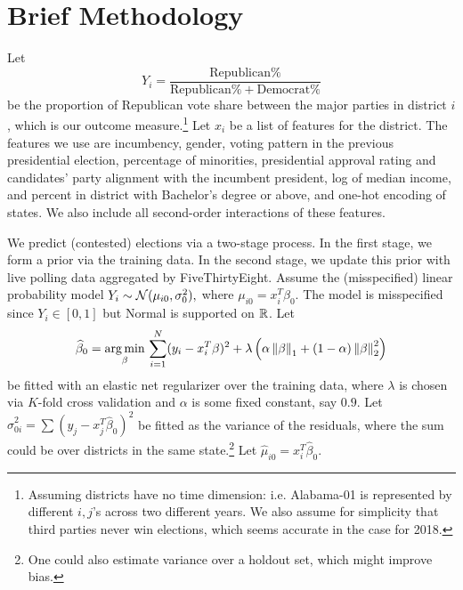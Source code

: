 \documentclass[12pt]{article}
\begin{document}
\section*{Brief Methodology}
Let \[Y_i = \frac{\text{Republican}\% }{\text{Republican}\% + \text{Democrat}\%}\] be the proportion of Republican vote share between the major parties in district $i$, which is our outcome measure.\footnote{Assuming districts have no time dimension: i.e. Alabama-01 is represented by different $i,j$'s across two different years. We also assume for simplicity that third parties never win elections, which seems accurate in the case for 2018.} Let $x_i$ be a list of features for the district. The features we use are incumbency, gender, voting pattern in the previous presidential election, percentage of minorities, presidential approval rating and candidates' party alignment with the incumbent president, log of median income, and percent in district with Bachelor's degree or above, and one-hot encoding of states. We also include all second-order interactions of these features.

We predict (contested) elections via a two-stage process. In the first stage, we form a prior via the training data. In the second stage, we update this prior with live polling data aggregated by FiveThirtyEight. Assume the (misspecified) linear probability model
$Y_i \sim \mathcal{N}(\mu_{i0}, \sigma_0^2),$ where $\mu_{i0} = x_i^T \beta_0$. The model is misspecified since $Y_i \in [0,1]$ but Normal is supported on $\mathbb{R}$. Let \begin{align*}
\widehat \beta_0 = \operatorname*{arg\,min}_\beta \, \sum_{i=1}^{N} (y_i - x_i^T \beta)^2 + \lambda\left({\alpha \left\lVert\beta\right\rVert_1 + (1-\alpha) \left\lVert\beta\right\rVert_2^2}\right)
\end{align*}
be fitted with an elastic net regularizer over the training data, where $\lambda$ is chosen via $K$-fold cross validation and $\alpha$ is some fixed constant, say $0.9$. Let $\hat \sigma_{0i}^2 = \sum (y_j - x_j^T \hat\beta_0)^2$ be fitted as the variance of the residuals, where the sum could be over districts in the same state.\footnote{One could also estimate variance over a holdout set, which might improve bias.} Let $\hat \mu_{i0} = x_i^T \hat \beta_0$.
\end{document}
